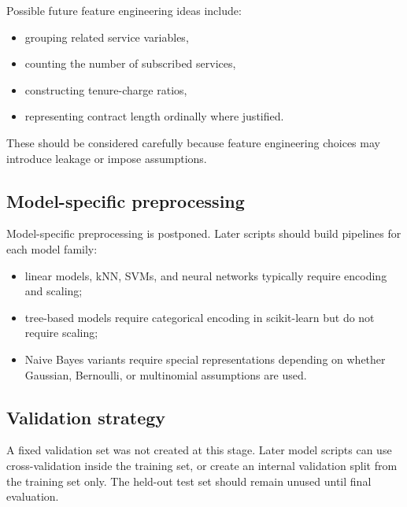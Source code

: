 Possible future feature engineering ideas include:
\begin{itemize}[leftmargin=*]
    \item grouping related service variables,
    \item counting the number of subscribed services,
    \item constructing tenure-charge ratios,
    \item representing contract length ordinally where justified.
\end{itemize}
These should be considered carefully because feature engineering choices may introduce leakage or impose assumptions.

\subsection{Model-specific preprocessing}

Model-specific preprocessing is postponed. Later scripts should build pipelines for each model family:
\begin{itemize}[leftmargin=*]
    \item linear models, kNN, SVMs, and neural networks typically require encoding and scaling;
    \item tree-based models require categorical encoding in scikit-learn but do not require scaling;
    \item Naive Bayes variants require special representations depending on whether Gaussian, Bernoulli, or multinomial assumptions are used.
\end{itemize}

\subsection{Validation strategy}

A fixed validation set was not created at this stage. Later model scripts can use cross-validation inside the training set, or create an internal validation split from the training set only. The held-out test set should remain unused until final evaluation.